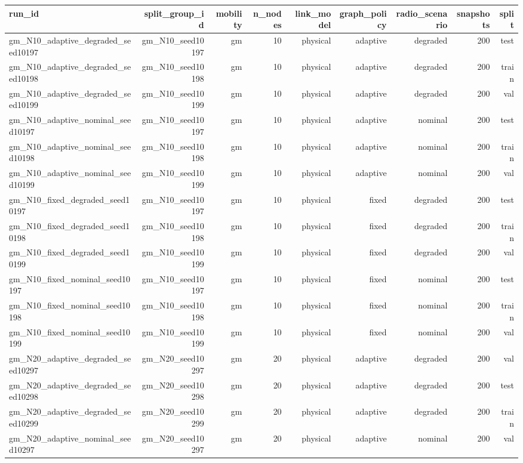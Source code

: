 \begin{tabular}{lrrrrrrrr}
\toprule
run\_id & split\_group\_id & mobility & n\_nodes & link\_model & graph\_policy & radio\_scenario & snapshots & split \\
\midrule
gm\_N10\_adaptive\_degraded\_seed10197 & gm\_N10\_seed10197 & gm & 10 & physical & adaptive & degraded & 200 & test \\
gm\_N10\_adaptive\_degraded\_seed10198 & gm\_N10\_seed10198 & gm & 10 & physical & adaptive & degraded & 200 & train \\
gm\_N10\_adaptive\_degraded\_seed10199 & gm\_N10\_seed10199 & gm & 10 & physical & adaptive & degraded & 200 & val \\
gm\_N10\_adaptive\_nominal\_seed10197 & gm\_N10\_seed10197 & gm & 10 & physical & adaptive & nominal & 200 & test \\
gm\_N10\_adaptive\_nominal\_seed10198 & gm\_N10\_seed10198 & gm & 10 & physical & adaptive & nominal & 200 & train \\
gm\_N10\_adaptive\_nominal\_seed10199 & gm\_N10\_seed10199 & gm & 10 & physical & adaptive & nominal & 200 & val \\
gm\_N10\_fixed\_degraded\_seed10197 & gm\_N10\_seed10197 & gm & 10 & physical & fixed & degraded & 200 & test \\
gm\_N10\_fixed\_degraded\_seed10198 & gm\_N10\_seed10198 & gm & 10 & physical & fixed & degraded & 200 & train \\
gm\_N10\_fixed\_degraded\_seed10199 & gm\_N10\_seed10199 & gm & 10 & physical & fixed & degraded & 200 & val \\
gm\_N10\_fixed\_nominal\_seed10197 & gm\_N10\_seed10197 & gm & 10 & physical & fixed & nominal & 200 & test \\
gm\_N10\_fixed\_nominal\_seed10198 & gm\_N10\_seed10198 & gm & 10 & physical & fixed & nominal & 200 & train \\
gm\_N10\_fixed\_nominal\_seed10199 & gm\_N10\_seed10199 & gm & 10 & physical & fixed & nominal & 200 & val \\
gm\_N20\_adaptive\_degraded\_seed10297 & gm\_N20\_seed10297 & gm & 20 & physical & adaptive & degraded & 200 & val \\
gm\_N20\_adaptive\_degraded\_seed10298 & gm\_N20\_seed10298 & gm & 20 & physical & adaptive & degraded & 200 & test \\
gm\_N20\_adaptive\_degraded\_seed10299 & gm\_N20\_seed10299 & gm & 20 & physical & adaptive & degraded & 200 & train \\
gm\_N20\_adaptive\_nominal\_seed10297 & gm\_N20\_seed10297 & gm & 20 & physical & adaptive & nominal & 200 & val \\

\end{tabular}
